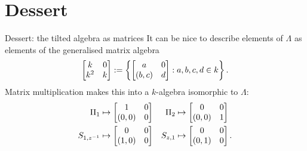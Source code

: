 \documentclass[
  xcolor=dvipsnames,
  aspectratio=169,
  compress
]{beamer}
\begin{document}
\section{Dessert}

\begin{frame}{Dessert: the tilted algebra as matrices}
  It can be nice to describe elements of $\Lambda$ as elements of the \alert{generalised matrix algebra}
  \[
    \begin{bmatrix} {k} & {0} \\ {k^2} & {k} \end{bmatrix}
    :=
    \left\{
      \begin{bmatrix} {a} & {0} \\ {(b, c)} & {d} \end{bmatrix}: a, b, c, d \in k
    \right\}.
  \]
  Matrix multiplication makes this into a $k$-algebra isomorphic to $\Lambda$:
  \begin{align*}
    \Pi_1 &\mapsto \begin{bmatrix} {1} & {0} \\ {(0, 0)} & {0} \end{bmatrix} & \Pi_2 &\mapsto \begin{bmatrix} {0} & {0} \\ {(0, 0)} & {1} \end{bmatrix} \\
    S_{1, z^{-1}} &\mapsto \begin{bmatrix} {0} & {0} \\ {(1, 0)} & {0} \end{bmatrix} & S_{z, 1} &\mapsto \begin{bmatrix} {0} & {0} \\ {(0, 1)} & {0} \end{bmatrix}.
  \end{align*}
\end{frame}
\end{document}
